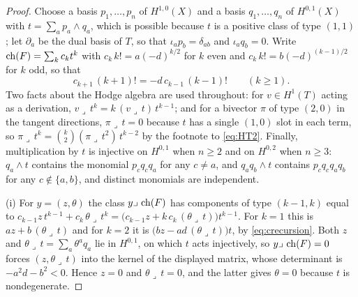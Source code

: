 \begin{proof}
Choose a basis $p_{1},\dots,p_{n}$ of $H^{1,0}(X)$ and a basis
$q_{1},\dots,q_{n}$ of $H^{0,1}(X)$ with $t=\sum_{a}p_{a}\wedge q_{a}$, which
is possible because $t$ is a positive class of type $(1,1)$; let
$\partial_{a}$ be the dual basis of $T$, so that $\iota_{a}p_{b}=\delta_{ab}$
and $\iota_{a}q_{b}=0$. Write $\operatorname{ch}(F)=\sum_{k}c_{k}t^{k}$ with
$c_{k}\,k!=a(-d)^{k/2}$ for $k$ even and $c_{k}\,k!=b(-d)^{(k-1)/2}$ for $k$
odd, so that
\begin{equation}\label{eq:crecursion}
  c_{k+1}\,(k+1)!=-d\,c_{k-1}\,(k-1)!\qquad(k\ge1).
\end{equation}
Two facts about the Hodge algebra are used throughout: for $v\in H^{1}(T)$
acting as a derivation, $v\lrcorner\,t^{k}=k\,(v\lrcorner\,t)\,t^{k-1}$; and
for a bivector $\pi$ of type $(2,0)$ in the tangent directions,
$\pi\lrcorner\,t=0$ because $t$ has a single $(1,0)$ slot in each term, so
$\pi\lrcorner\,t^{k}=\binom{k}{2}(\pi\lrcorner\,t^{2})\,t^{k-2}$ by the footnote
to \eqref{eq:HT2}. Finally, multiplication by $t$ is injective on $H^{0,1}$
when $n\ge2$ and on $H^{0,2}$ when $n\ge3$: $q_{a}\wedge t$ contains the
monomial $p_{c}q_{c}q_{a}$ for any $c\ne a$, and $q_{a}q_{b}\wedge t$ contains
$p_{c}q_{c}q_{a}q_{b}$ for any $c\notin\{a,b\}$, and distinct monomials are
independent.

(i) For $y=(z,\theta)$ the class $y\lrcorner\,\operatorname{ch}(F)$ has components of type
$(k-1,k)$ equal to $c_{k-1}z\,t^{k-1}+c_{k}\,\theta\lrcorner\,t^{k}
=\bigl(c_{k-1}z+k\,c_{k}\,(\theta\lrcorner\,t)\bigr)t^{k-1}$. For $k=1$ this
is $az+b\,(\theta\lrcorner\,t)$ and for $k=2$ it is
$\bigl(bz-ad\,(\theta\lrcorner\,t)\bigr)t$, by \eqref{eq:crecursion}. Both
$z$ and $\theta\lrcorner\,t=\sum_{a}\theta^{a}q_{a}$ lie in $H^{0,1}$, on which
$t$ acts injectively, so $y\lrcorner\,\operatorname{ch}(F)=0$ forces
$(z,\theta\lrcorner\,t)$ into the kernel of the displayed matrix, whose
determinant is $-a^{2}d-b^{2}<0$. Hence $z=0$ and $\theta\lrcorner\,t=0$, and
the latter gives $\theta=0$ because $t$ is nondegenerate.


\end{proof}
